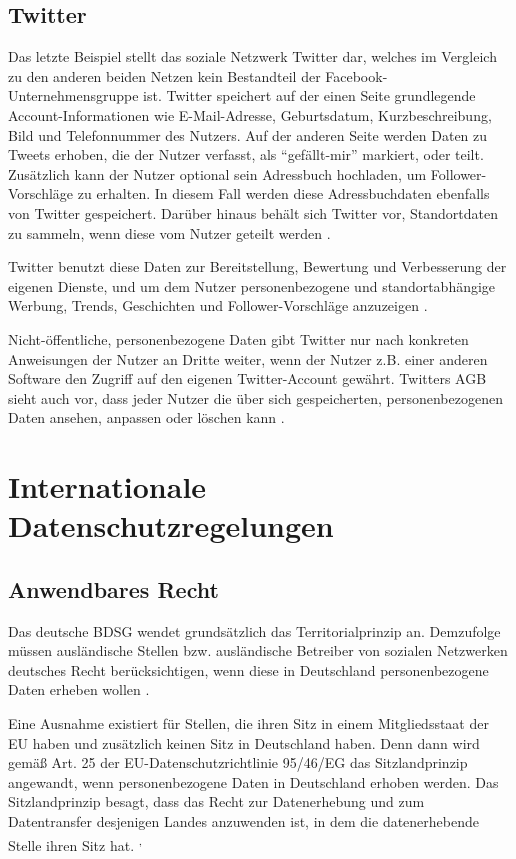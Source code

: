 \section{Twitter}
Das letzte Beispiel stellt das soziale Netzwerk Twitter dar, welches im Vergleich zu den anderen beiden Netzen kein Bestandteil der Facebook-Unternehmensgruppe ist. Twitter speichert auf der einen Seite grundlegende Account-Informationen wie E-Mail-Adresse, Geburtsdatum, Kurzbeschreibung, Bild und Telefonnummer des Nutzers.  Auf der anderen Seite werden Daten zu Tweets erhoben, die der Nutzer verfasst, als "`gefällt-mir"' markiert, oder teilt. Zusätzlich kann der Nutzer optional sein Adressbuch hochladen, um Follower-Vorschläge zu erhalten. In diesem Fall werden diese Adressbuchdaten ebenfalls von Twitter gespeichert. Darüber hinaus behält sich Twitter vor, Standortdaten zu sammeln, wenn diese vom Nutzer geteilt werden \autocite[vgl.][]{TwitterInc..2017}.
\par
Twitter benutzt diese Daten zur Bereitstellung, Bewertung und Verbesserung der eigenen Dienste, und um dem Nutzer personenbezogene und standortabhängige Werbung, Trends, Geschichten und Follower-Vorschläge anzuzeigen \autocite[vgl.][]{TwitterInc..2017}. 
\par
Nicht-öffentliche, personenbezogene Daten gibt Twitter nur nach konkreten Anweisungen der Nutzer an Dritte weiter, wenn der Nutzer z.B. einer anderen Software den Zugriff auf den eigenen Twitter-Account gewährt. Twitters AGB sieht auch vor, dass jeder Nutzer die über sich gespeicherten, personenbezogenen Daten ansehen, anpassen oder löschen kann \autocite[vgl.][]{TwitterInc..2017}.

\chapter{Internationale Datenschutzregelungen}
\section{Anwendbares Recht}
Das deutsche \ac{BDSG} wendet grundsätzlich das Territorialprinzip an. Demzufolge müssen ausländische Stellen bzw. ausländische Betreiber von sozialen Netzwerken deutsches Recht berücksichtigen, wenn diese in Deutschland personenbezogene Daten erheben wollen \autocite[vgl.][]{ICS.2011}.
\par
Eine Ausnahme existiert für Stellen, die ihren Sitz in einem Mitgliedsstaat der \ac{EU} haben und zusätzlich keinen Sitz in Deutschland haben. Denn dann wird gemäß Art. 25 der EU-Datenschutzrichtlinie 95/46/EG das Sitzlandprinzip angewandt, wenn personenbezogene Daten in Deutschland erhoben werden. Das Sitzlandprinzip besagt, dass das Recht zur Datenerhebung und zum Datentransfer desjenigen Landes anzuwenden ist, in dem die datenerhebende Stelle ihren Sitz hat. \autocite[vgl.][]{ICS.2011}\textsuperscript{,}\autocite[vgl.][]{EG.1995}

